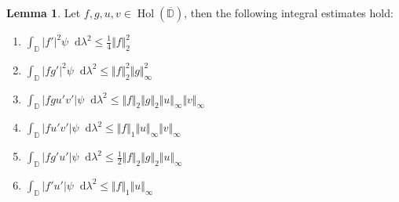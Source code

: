 \documentclass[letterpaper, 11pt]{article}
\newcommand{\D}{\mathbb{D}}
\newcommand{\1}{\mathds{1}}
\newcommand{\dd}{\mathop{}\!\mathrm{d}}
\newcommand{\cl}[1]{\overline{#1}}
\DeclareMathOperator*{\Hol}{Hol}
\theoremstyle{definition}
\newtheorem{lemma}[theorem]{Lemma}
\begin{document}
\begin{lemma}
  Let $f, g, u, v \in \Hol(\cl{\D})$, then the following integral estimates hold:
  \begin{enumerate}
    \item $ \displaystyle \int_\D \vert f' \vert^2 \psi \dd \lambda^2 \leq \frac{1}{4} \Vert f \Vert_2^2 $
    \item $ \displaystyle \int_\D \vert f g' \vert^2 \psi \dd \lambda^2 \leq \Vert f \Vert_2^2 \Vert g \Vert_\infty^2 $
    \item $ \displaystyle \int_\D \vert f g u' v' \vert \psi \dd \lambda^2 \leq \Vert f \Vert_2 \Vert g \Vert_2 \Vert u \Vert_\infty \Vert v \Vert_\infty $
    \item $ \displaystyle \int_\D \vert f u' v' \vert \psi \dd \lambda^2 \leq \Vert f \Vert_1 \Vert u \Vert_\infty \Vert v \Vert_\infty $
    \item $ \displaystyle \int_\D \vert f g' u' \vert \psi \dd \lambda^2 \leq \frac{1}{2} \Vert f \Vert_2 \Vert g \Vert_2 \Vert u \Vert_\infty $
    \item $ \displaystyle \int_\D \vert f' u' \vert \psi \dd \lambda^2 \leq \Vert f \Vert_1 \Vert u \Vert_\infty $
  \end{enumerate}
\end{lemma}
\end{document}
